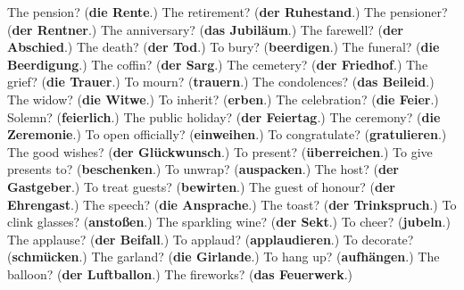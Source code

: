 \begin{tcolorbox}[breakable,colback=teal!4,colframe=teal!35!black,title={Before you move on}]
The pension? (\textbf{die Rente}.) The retirement? (\textbf{der Ruhestand}.) The pensioner? (\textbf{der Rentner}.) The anniversary? (\textbf{das Jubiläum}.) The farewell? (\textbf{der Abschied}.) The death? (\textbf{der Tod}.) To bury? (\textbf{beerdigen}.) The funeral? (\textbf{die Beerdigung}.) The coffin? (\textbf{der Sarg}.) The cemetery? (\textbf{der Friedhof}.) The grief? (\textbf{die Trauer}.) To mourn? (\textbf{trauern}.) The condolences? (\textbf{das Beileid}.) The widow? (\textbf{die Witwe}.) To inherit? (\textbf{erben}.) The celebration? (\textbf{die Feier}.) Solemn? (\textbf{feierlich}.) The public holiday? (\textbf{der Feiertag}.) The ceremony? (\textbf{die Zeremonie}.) To open officially? (\textbf{einweihen}.) To congratulate? (\textbf{gratulieren}.) The good wishes? (\textbf{der Glückwunsch}.) To present? (\textbf{überreichen}.) To give presents to? (\textbf{beschenken}.) To unwrap? (\textbf{auspacken}.) The host? (\textbf{der Gastgeber}.) To treat guests? (\textbf{bewirten}.) The guest of honour? (\textbf{der Ehrengast}.) The speech? (\textbf{die Ansprache}.) The toast? (\textbf{der Trinkspruch}.) To clink glasses? (\textbf{anstoßen}.) The sparkling wine? (\textbf{der Sekt}.) To cheer? (\textbf{jubeln}.) The applause? (\textbf{der Beifall}.) To applaud? (\textbf{applaudieren}.) To decorate? (\textbf{schmücken}.) The garland? (\textbf{die Girlande}.) To hang up? (\textbf{aufhängen}.) The balloon? (\textbf{der Luftballon}.) The fireworks? (\textbf{das Feuerwerk}.)
\end{tcolorbox}
